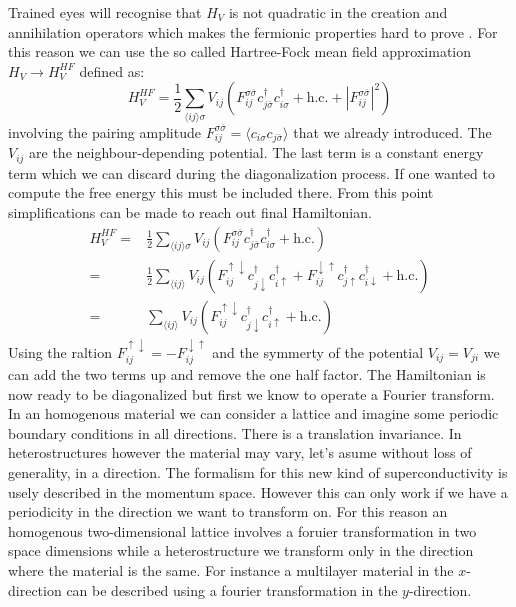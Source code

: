 \documentclass[../main.tex]{subfile}
\begin{document}
Trained eyes will recognise that $H_V$ is not quadratic in the creation and annihilation operators which makes the fermionic properties hard to prove . For this reason we can 
use the so called Hartree-Fock mean field approximation $H_V \rightarrow H^{HF}_V$ defined as:
\begin{equation}
    H^{HF}_V = \frac{1}{2} \sum_{\langle ij\rangle \sigma} V_{ij} \left(F_{ij}^{\sigma \bar{\sigma}} c^{\dagger}_{j\bar{\sigma}}c^{\dagger}_{i\sigma} + \text{h.c.} + |F_{ij}^{\sigma \bar{\sigma}}|^2\right)
\end{equation}
involving the pairing amplitude $F_{ij}^{\sigma \bar{\sigma}} = \langle c_{i\sigma}c_{j\bar{\sigma}}\rangle$ that we already introduced. The $V_{ij}$ are the neighbour-depending potential.
The last term is a constant energy term which we can discard during the diagonalization process. If one wanted to compute the free energy this must be included there. From this point simplifications
can be made to reach out final Hamiltonian.\\
\begin{equation}
    \begin{aligned}
        H^{HF}_V =& \frac{1}{2} \sum_{\langle ij\rangle \sigma} V_{ij} \left(F_{ij}^{\sigma \bar{\sigma}} c^{\dagger}_{j\bar{\sigma}}c^{\dagger}_{i\sigma} + \text{h.c.}\right)\\
            =& \frac{1}{2}\sum_{\langle ij\rangle} V_{ij} \left(F_{ij}^{\uparrow \downarrow} c^{\dagger}_{j\downarrow}c^{\dagger}_{i\uparrow} + F_{ij}^{\downarrow\uparrow} c^{\dagger}_{j\uparrow}c^{\dagger}_{i\downarrow} + \text{h.c.}\right)\\
            =& \sum_{\langle ij\rangle} V_{ij} \left(F_{ij}^{\uparrow \downarrow} c^{\dagger}_{j\downarrow}c^{\dagger}_{i\uparrow} + \text{h.c.}\right)
    \end{aligned}
\end{equation}
Using the raltion $F_{ij}^{\uparrow\downarrow} = -F_{ij}^{\downarrow\uparrow}$ and the symmerty of the potential $V_{ij} = V_{ji}$ we can add the two terms up and remove the one half factor. 
 The Hamiltonian is now ready to be diagonalized but first we know to operate a Fourier transform.\\
 
 In an homogenous material we can consider a lattice and imagine some periodic boundary conditions in all directions. There is a translation invariance.
 In heterostructures however the material may vary, let's asume
 without loss of generality, in a direction. The formalism for this new kind of superconductivity is usely described in the momentum space. However this can only work if we have
 a periodicity in the direction we want to transform on. For this reason an homogenous two-dimensional lattice involves a foruier transformation in two space dimensions while a heterostructure
 we transform only in the direction where the material is the same. For instance a multilayer material in the $x$-direction can be described using a fourier transformation in the $y$-direction.\\
\end{document}
